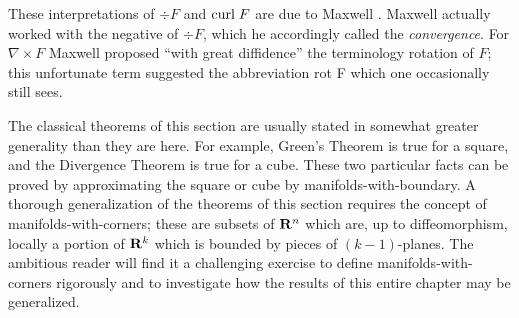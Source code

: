 These interpretations of $\div F$ and $\mathrm{curl}\; F$ are due to Maxwell \cite{maxwell1954electricity}.
Maxwell actually worked with the negative of $\div F$, which he accordingly 
called the \textit{convergence}. For $\nabla\times F$ Maxwell proposed ``with great diffidence'' 
the terminology rotation of $F$; this unfortunate term suggested the abbreviation
rot F which one occasionally still sees.

The classical theorems of this section are usually stated in
somewhat greater generality than they are here. For example, Green's Theorem 
is true for a square, and the Divergence Theorem is true for a cube. 
These two particular facts can be proved by approximating the 
square or cube by manifolds-with-boundary. A thorough generalization of the theorems of
this section requires the concept of manifolds-with-corners;
these are subsets of $\mathbf{R}^n$ which are, up to diffeomorphism,
locally a portion of $\mathbf{R}^k$ which is bounded by pieces of $(k-1)$-planes.
The ambitious reader will find it a challenging exercise to define manifolds-with-corners 
rigorously and to investigate how the results of this entire chapter may be generalized.

\newpage
\begin{problems}
\end{problems}
